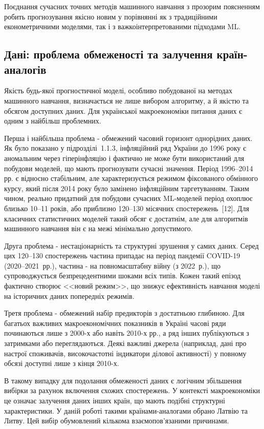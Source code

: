 \documentclass[a4paper,ukrainian,oneside]{extreport}
\begin{document}
Поєднання сучасних точних методів машинного навчання з прозорим поясненням робить прогнозування якісно новим у порівнянні як з традиційними економетричними моделями, так і з важкоінтерпретованими підходами ML.

\subsection{Дані: проблема обмеженості та залучення країн-аналогів}

Якість будь-якої прогностичної моделі, особливо побудованої на методах машинного навчання, визначається не лише вибором алгоритму, а й якістю та обсягом доступних даних. Для української макроекономіки питання даних є одним з найбільш проблемних.

Перша і найбільша проблема - обмежений часовий горизонт однорідних даних. Як було показано у підрозділі~1.1.3, інфляційний ряд України до 1996 року є аномальним через гіперінфляцію і фактично не може бути використаний для побудови моделей, що мають прогнозувати сучасні значення. Період 1996--2014 рр. є відносно стабільним, але характеризується режимом фіксованого обмінного курсу, який після 2014 року було замінено інфляційним таргетуванням. Таким чином, реально придатний для побудови сучасних ML-моделей період охоплює близько 10--11 років, або приблизно 120--130 місячних спостережень~[12]. Для класичних статистичних моделей такий обсяг є достатнім, але для алгоритмів машинного навчання він є на межі мінімально допустимого.

Друга проблема - нестаціонарність та структурні зрушення у самих даних. Серед цих 120--130 спостережень частина припадає на період пандемії COVID-19 (2020--2021~рр.), частина - на повномасштабну війну (з 2022~р.), що супроводжується безпрецедентними шоками всіх типів. Кожен такий епізод фактично створює <<новий режим>>, що знижує ефективність навчання моделі на історичних даних попередніх режимів.

Третя проблема - обмежений набір предикторів з достатньою глибиною. Для багатьох важливих макроекономічних показників в Україні часові ряди починаються лише з 2000-х або навіть 2010-х рр., а ряд інших публікуються з затримками або переглядаються. Деякі важливі джерела (наприклад, дані про настрої споживачів, високочастотні індикатори ділової активності) у повному обсязі доступні лише з кінця 2010-х.

В такому випадку для подолання обмеженості даних є логічним збільшення вибірки за рахунок включення схожих спостережень. У контексті макроекономіки це означає залучення даних інших країн, що мають подібні структурні характеристики. У даній роботі такими країнами-аналогами обрано Латвію та Литву. Цей вибір обумовлений кількома взаємопов'язаними причинами.
\end{document}
